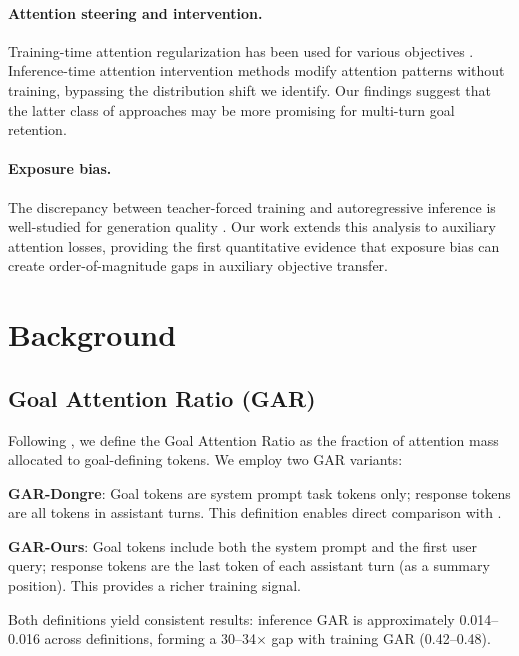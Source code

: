 \documentclass[11pt,a4paper]{article}
\begin{document}
\paragraph{Attention steering and intervention.}
Training-time attention regularization has been used for various objectives \citep{ghader2017attention,strubell2018linguistically}.
Inference-time attention intervention methods \citep{li2023inference,todd2024function} modify attention patterns without training, bypassing the distribution shift we identify.
Our findings suggest that the latter class of approaches may be more promising for multi-turn goal retention.

\paragraph{Exposure bias.}
The discrepancy between teacher-forced training and autoregressive inference is well-studied for generation quality \citep{ranzato2016sequence,bengio2015scheduled}.
Our work extends this analysis to auxiliary attention losses, providing the first quantitative evidence that exposure bias can create order-of-magnitude gaps in auxiliary objective transfer.

\section{Background}

\subsection{Goal Attention Ratio (GAR)}

Following \citet{dongre2026}, we define the Goal Attention Ratio as the fraction of attention mass allocated to goal-defining tokens.
We employ two GAR variants:

\textbf{GAR-Dongre}: Goal tokens are system prompt task tokens only; response tokens are all tokens in assistant turns.
This definition enables direct comparison with \citet{dongre2026}.

\textbf{GAR-Ours}: Goal tokens include both the system prompt and the first user query; response tokens are the last token of each assistant turn (as a summary position).
This provides a richer training signal.

Both definitions yield consistent results: inference GAR is approximately 0.014--0.016 across definitions, forming a 30--34$\times$ gap with training GAR (0.42--0.48).
\end{document}
